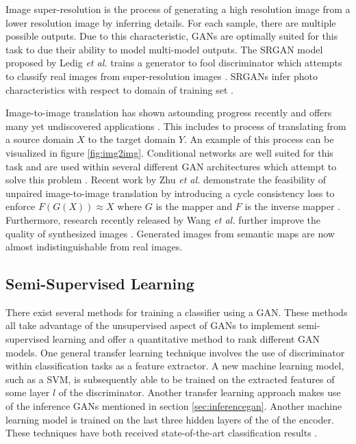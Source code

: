 \documentclass[11pt]{article}
\begin{document}
Image super-resolution is the process of generating a high resolution image from a lower resolution image by inferring details. For each sample, there are multiple possible outputs. Due to this characteristic, GANs are optimally suited for this task to due their ability to model multi-model outputs. The SRGAN model proposed by Ledig \textit{et al.} trains a generator to fool discriminator which attempts to classify real images from super-resolution images \citep{2016arXiv160904802L}. SRGANs infer photo characteristics with respect to domain of training set \citep{2017arXiv171007035C}.

Image-to-image translation has shown astounding progress recently and offers many yet undiscovered applications \citep{2017arXiv170100160G}. This includes to process of translating from a source domain $X$ to the target domain $Y$. An example of this process can be visualized in figure \ref{fig:img2img}. Conditional networks are well suited for this task and are used within several different GAN architectures which attempt to solve this problem \citep{2016arXiv161107004I, 2017arXiv171111585W, 2017arXiv170310593Z}. Recent work by Zhu \textit{et al.} demonstrate the feasibility of unpaired image-to-image translation by introducing a cycle consistency loss to enforce $F(G(X)) ≈ X$ where $G$ is the mapper and $F$ is the inverse mapper \citep{2017arXiv170310593Z}. Furthermore, research recently released by Wang \textit{et al.} further improve the quality of synthesized images \citep{2017arXiv171111585W}. Generated images from semantic maps are now almost indistinguishable from real images.

\subsection{Semi-Supervised Learning} \label{sec:semisupervised}
There exist several methods for training a classifier using a GAN. These methods all take advantage of the unsupervised aspect of GANs to implement semi-supervised learning and offer a quantitative method to rank different GAN models. One general transfer learning technique involves the use of discriminator within classification tasks as a feature extractor. A new machine learning model, such as a SVM, is subsequently able to be trained on the extracted features of some layer $l$ of the discriminator. Another transfer learning approach makes use of the inference GANs mentioned in section \ref{sec:inferencegan}. Another machine learning model is trained on the last three hidden layers of the of the encoder. These techniques have both received state-of-the-art classification results \citep{2017arXiv171007035C}.
\end{document}
